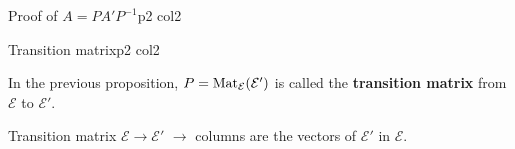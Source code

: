 \documentclass[course,noautoquant,noautokw]{neyvia-study}
\begin{document}
\begin{concept}[1.57]{Proof of $A=PA'P^{-1}$}{p2 col2}
\begin{traps}
\end{traps}
\begin{practice}
\end{practice}
\end{concept}
\begin{concept}[1.58]{Transition matrix}{p2 col2}
\begin{definition}
\noindent In the previous proposition, $P=\operatorname{Mat}_{\mathcal E}(\mathcal E')$ is called the \textbf{transition matrix} from $\mathcal E$ to $\mathcal E'$.
\end{definition}
\begin{reflex}
Transition matrix $\mathcal E\to\mathcal E'$ \ensuremath{\rightarrow} columns are the vectors of $\mathcal E'$ in $\mathcal E$.
\end{reflex}
\begin{traps}
\end{traps}
\end{concept}
\end{document}
